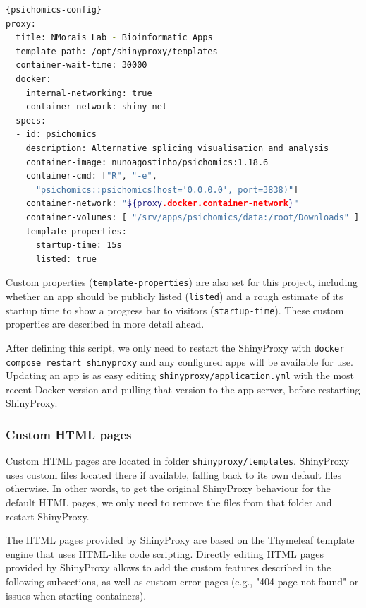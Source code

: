 \begin{lstlisting}[caption=Simplified ShinyProxy configuration with \texttt{psichomics}.,language=bash,label={lst:psichomics-config}]{psichomics-config}
proxy:
  title: NMorais Lab - Bioinformatic Apps
  template-path: /opt/shinyproxy/templates
  container-wait-time: 30000
  docker:
    internal-networking: true
    container-network: shiny-net
  specs:
  - id: psichomics
    description: Alternative splicing visualisation and analysis
    container-image: nunoagostinho/psichomics:1.18.6
    container-cmd: ["R", "-e",
      "psichomics::psichomics(host='0.0.0.0', port=3838)"]
    container-network: "${proxy.docker.container-network}"
    container-volumes: [ "/srv/apps/psichomics/data:/root/Downloads" ]
    template-properties:
      startup-time: 15s
      listed: true
\end{lstlisting}

Custom properties (\texttt{template-properties}) are also set for this project, including whether an app should be publicly listed (\texttt{listed}) and a rough estimate of its startup time to show a progress bar to visitors (\texttt{startup-time}). These custom properties are described in more detail ahead.

After defining this script, we only need to restart the ShinyProxy with \texttt{docker compose restart shinyproxy} and any configured apps will be available for use. Updating an app is as easy editing \texttt{shinyproxy/application.yml} with the most recent Docker version and pulling that version to the app server, before restarting ShinyProxy.

\subsubsection{Custom HTML pages}

Custom HTML pages are located in folder \texttt{shinyproxy/templates}. ShinyProxy uses custom files located there if available, falling back to its own default files otherwise. In other words, to get the original ShinyProxy behaviour for the default HTML pages, we only need to remove the files from that folder and restart ShinyProxy.

The HTML pages provided by ShinyProxy are based on the Thymeleaf template engine that uses HTML-like code scripting. Directly editing HTML pages provided by ShinyProxy allows to add the custom features described in the following subsections, as well as custom error pages (e.g., "404 page not found" or issues when starting containers).

